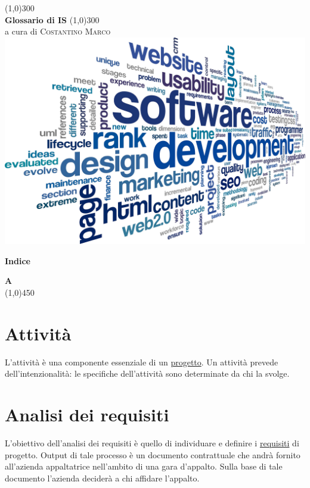 \documentclass[11pt]{article}
\begin{document}
	\begin{titlepage}
		\begin{center}
		\line(1,0){300}\\
		[3.5mm]
		\huge{\bfseries Glossario di IS}
		\line(1,0){300} \\
		[2mm]
		\large{a cura di}
		\textsc{\LARGE Costantino Marco} \\
		[3cm]
		\includegraphics[scale=0.1]{sd.png}
		\end{center}
		
	\end{titlepage}
	
	\renewcommand\contentsname{}
	\renewcommand\headrulewidth{0pt}
	\textbf{\Huge Indice}
	\tableofcontents
	\fancyhead{}
	\fancyfoot{}
	\cleardoublepage
	\fancyfoot[R]{\thepage}
	\setcounter{page}{1}

	{\Huge{\textbf{A}}} \\
	\line(1,0){450}
	
	\section{\LARGE Attività}
	\label{sec:attivita}
	L'attività è una componente essenziale di un \hyperref[sec:progetto]{progetto}. Un attività prevede dell'intenzionalità: le specifiche dell'attività sono determinate da chi la svolge. 	
	
	\section{\LARGE Analisi dei requisiti}
	\label{sec:analisirequisiti}
	L'obiettivo dell'analisi dei requisiti è quello di individuare e definire i \hyperref[sec:requisito]{requisiti} di progetto. Output di tale processo è un documento contrattuale che andrà fornito all'azienda appaltatrice nell'ambito di una gara d'appalto. Sulla base di tale documento l'azienda deciderà a chi affidare l'appalto. \newpage
\end{document}
